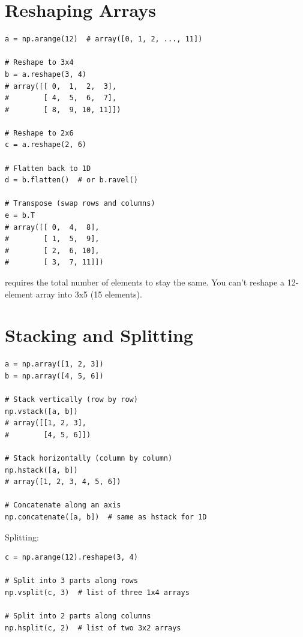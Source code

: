 \section{Reshaping Arrays}
\label{sec:reshaping}

\begin{lstlisting}
a = np.arange(12)  # array([0, 1, 2, ..., 11])

# Reshape to 3x4
b = a.reshape(3, 4)
# array([[ 0,  1,  2,  3],
#        [ 4,  5,  6,  7],
#        [ 8,  9, 10, 11]])

# Reshape to 2x6
c = a.reshape(2, 6)

# Flatten back to 1D
d = b.flatten()  # or b.ravel()

# Transpose (swap rows and columns)
e = b.T
# array([[ 0,  4,  8],
#        [ 1,  5,  9],
#        [ 2,  6, 10],
#        [ 3,  7, 11]])
\end{lstlisting}

\begin{warning}
 requires the total number of elements to stay the same. You can't reshape a 12-element array into 3x5 (15 elements).
\end{warning}

\section{Stacking and Splitting}
\label{sec:stacking}

\begin{lstlisting}
a = np.array([1, 2, 3])
b = np.array([4, 5, 6])

# Stack vertically (row by row)
np.vstack([a, b])
# array([[1, 2, 3],
#        [4, 5, 6]])

# Stack horizontally (column by column)
np.hstack([a, b])
# array([1, 2, 3, 4, 5, 6])

# Concatenate along an axis
np.concatenate([a, b])  # same as hstack for 1D
\end{lstlisting}

Splitting:

\begin{lstlisting}
c = np.arange(12).reshape(3, 4)

# Split into 3 parts along rows
np.vsplit(c, 3)  # list of three 1x4 arrays

# Split into 2 parts along columns
np.hsplit(c, 2)  # list of two 3x2 arrays
\end{lstlisting}

